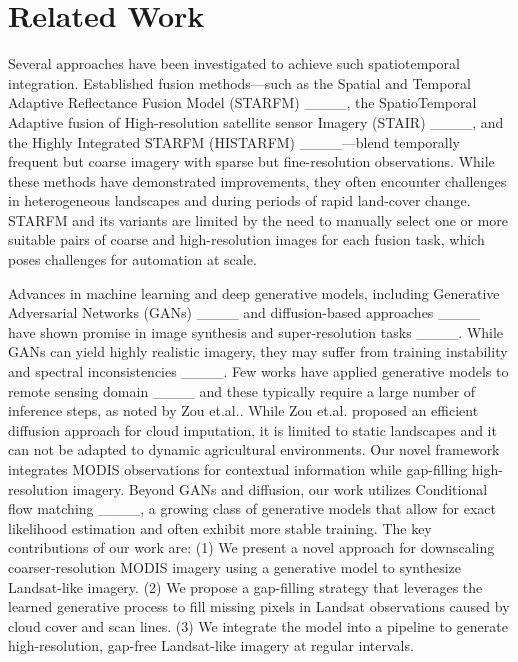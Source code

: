 \section{Related Work}
Several approaches have been investigated to achieve such spatiotemporal integration. Established fusion methods—such as the 
Spatial and Temporal Adaptive Reflectance Fusion Model (STARFM) ____, the SpatioTemporal Adaptive fusion 
of High-resolution satellite sensor Imagery (STAIR) ____, and the Highly Integrated STARFM (HISTARFM) 
____—blend temporally frequent but coarse imagery with sparse but fine-resolution 
observations. While these methods have demonstrated improvements, they often encounter challenges in heterogeneous landscapes and during periods of rapid land-cover change. STARFM and its variants are limited by the need to manually select one or more suitable pairs of coarse and high-resolution images for each fusion task, which poses challenges for automation at scale.


Advances in machine learning and deep generative models, including Generative Adversarial Networks (GANs) ____ and diffusion-based approaches ____ have shown promise in image synthesis and super-resolution tasks  ____. While GANs can yield highly realistic imagery, they may suffer from training instability and spectral inconsistencies ____.
Few works have applied generative models to remote sensing domain ____ and these typically require a large number of inference steps, as noted by Zou et.al.. While Zou et.al. proposed an efficient diffusion approach for cloud imputation, it is limited to static landscapes and it can not be adapted to dynamic agricultural environments. Our novel framework integrates MODIS observations for contextual information while gap-filling high-resolution imagery. Beyond GANs and diffusion, our work utilizes Conditional flow matching ____, a growing class of generative models that allow for exact likelihood estimation and often exhibit more stable training. The key contributions of our work are: (1) We present a novel approach for downscaling coarser-resolution MODIS imagery using a generative model to synthesize Landsat-like imagery. (2) We propose a gap-filling strategy that leverages the learned generative process to fill missing pixels in Landsat observations caused by cloud cover and scan lines. (3) We integrate the model into a pipeline to generate high-resolution, gap-free Landsat-like imagery at regular intervals.